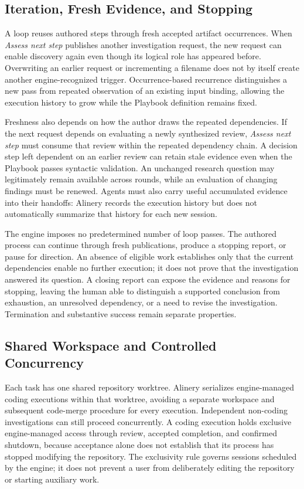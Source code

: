 \documentclass[letterpaper]{article}
\theoremstyle{definition}
\begin{document}
\subsection{Iteration, Fresh Evidence, and Stopping}

A loop reuses authored steps through fresh accepted artifact occurrences.
When \emph{Assess next step} publishes another investigation request,
the new request can enable discovery again even though its logical role
has appeared before. Overwriting an earlier request or incrementing a
filename does not by itself create another engine-recognized trigger.
Occurrence-based recurrence distinguishes a new pass from repeated
observation of an existing input binding, allowing the execution history
to grow while the Playbook definition remains fixed.

Freshness also depends on how the author draws the repeated dependencies.
If the next request depends on evaluating a newly synthesized review,
\emph{Assess next step} must consume that review within the repeated
dependency chain. A decision step left dependent on an earlier review can
retain stale evidence even when the Playbook passes syntactic validation.
An unchanged research question may legitimately remain available across
rounds, while an evaluation of changing findings must be renewed. Agents
must also carry
useful accumulated evidence into their handoffs: Alinery records the
execution history but does not automatically summarize that history for
each new session.

The engine imposes no predetermined number of loop passes. The authored
process can continue through fresh publications, produce a stopping report,
or pause for direction. An absence of eligible work establishes only that
the current dependencies enable no further execution; it does not prove
that the investigation answered its question. A closing report can expose
the evidence and reasons for stopping, leaving the human able to distinguish
a supported conclusion from exhaustion, an unresolved dependency, or a need
to revise the investigation. Termination and substantive success remain
separate properties.

\subsection{Shared Workspace and Controlled Concurrency}

Each task has one shared repository worktree. Alinery serializes
engine-managed coding executions within that worktree, avoiding a separate
workspace and subsequent code-merge procedure for every execution.
Independent non-coding investigations can still proceed concurrently.
A coding execution holds exclusive engine-managed access through review,
accepted completion, and confirmed shutdown, because acceptance alone does
not establish that its process has stopped modifying the repository.
The exclusivity rule governs sessions scheduled by the engine; it does not
prevent a user from deliberately editing the repository or starting
auxiliary work.
\end{document}
